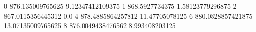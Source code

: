 0 876.135009765625 9.12347412109375
1 868.5927734375 1.58123779296875
2 867.0115356445312 0.0
4 878.4885864257812 11.47705078125
6 880.0828857421875 13.07135009765625
8 876.0049438476562 8.993408203125

